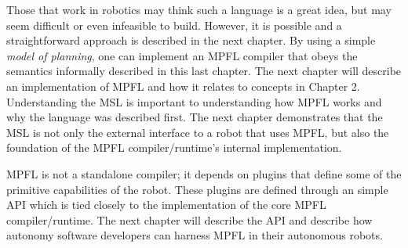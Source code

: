 Those that work in robotics may think such a language is a great idea, but may seem difficult or even infeasible to build. However, it is possible and a straightforward approach is described in the next chapter. By using a simple \textit{model of planning}, one can implement an MPFL compiler that obeys the semantics informally described in this last chapter. The next chapter will describe an implementation of MPFL and how it relates to concepts in Chapter 2. Understanding the MSL is important to understanding how MPFL works and why the language was described first. The next chapter demonstrates that the MSL is not only the external interface to a robot that uses MPFL, but also the foundation of the MPFL compiler/runtime's internal implementation.

MPFL is not a standalone compiler; it depends on plugins that define some of the primitive capabilities of the robot. These plugins are defined through an simple API which is tied closely to the implementation of the core MPFL compiler/runtime. The next chapter will describe the API and describe how autonomy software developers can harness MPFL in their autonomous robots.

